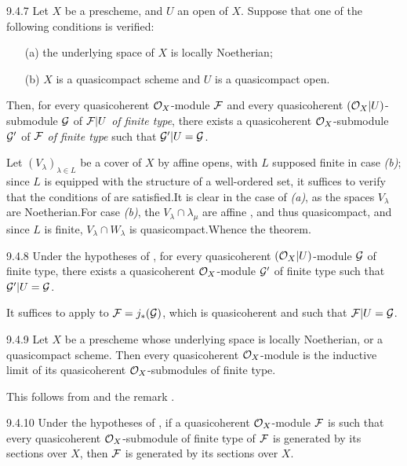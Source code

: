 \begin{env}[Theorem]{9.4.7}
Let $X$ be a prescheme, and $U$ an open of $X$.
Suppose that one of the following conditions is verified:
\begin{itemize}
  \item[(a)] the underlying space of $X$ is locally Noetherian;
  \item[(b)] $X$ is a quasicompact scheme and $U$ is a quasicompact open.
\end{itemize}
Then, for every quasicoherent $\mathcal{O}_X$-module $\mathcal{F}$ and every quasicoherent
$(\mathcal{O}_X|U)$-submodule $\mathcal{G}$ of $\mathcal{F}|U$ \emph{of finite type}, there exists a
quasicoherent $\mathcal{O}_X$-submodule $\mathcal{G}'$ of $\mathcal{F}$ \emph{of finite type}
such that $\mathcal{G}'|U=\mathcal{G}$.
\end{env}

Let $(V_\lambda)_{\lambda\in L}$ be a cover of $X$ by affine opens,
with $L$ supposed finite in case \emph{(b)}; since $L$ is equipped with the
structure of a well-ordered set, it suffices to verify that the conditions of
 are satisfied.It is clear in the case of \emph{(a)}, as the spaces
$V_\lambda$ are Noetherian.For case \emph{(b)}, the $V_\lambda\cap\lambda_\mu$
are affine , and thus quasicompact, and since $L$ is finite,
$V_\lambda\cap W_\lambda$ is quasicompact.Whence the theorem.

\begin{env}[Corollary]{9.4.8}
Under the hypotheses of , for every quasicoherent $(\mathcal{O}_X|U)$-module
$\mathcal{G}$ of finite type, there exists a quasicoherent $\mathcal{O}_X$-module $\mathcal{G}'$
of finite type such that $\mathcal{G}'|U=\mathcal{G}$.
\end{env}

It suffices to apply  to $\mathcal{F}=j_\ast(\mathcal{G})$, which is
quasicoherent  and such that $\mathcal{F}|U=\mathcal{G}$.

\begin{env}[Corollary]{9.4.9}
Let $X$ be a prescheme whose underlying space is locally Noetherian, or a
quasicompact scheme. Then every quasicoherent $\mathcal{O}_X$-module is the inductive limit
of its quasicoherent $\mathcal{O}_X$-submodules of finite type.
\end{env}

This follows from  and the remark .

\begin{env}[Corollary]{9.4.10}
Under the hypotheses of , if a quasicoherent $\mathcal{O}_X$-module $\mathcal{F}$
is such that every quasicoherent $\mathcal{O}_X$-submodule of finite type of $\mathcal{F}$ is
generated by its sections over $X$, then $\mathcal{F}$ is generated by its sections
over $X$.
\end{env}

